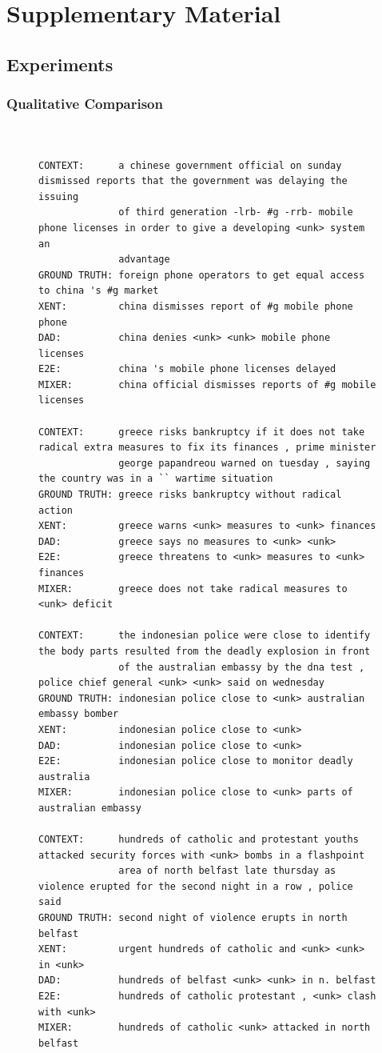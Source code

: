 \section{Supplementary Material}


\subsection{Experiments}


\subsubsection{Qualitative Comparison}
\begin{figure}[h!]
\tiny{
\begin{verbatim}


CONTEXT:      a chinese government official on sunday dismissed reports that the government was delaying the issuing
              of third generation -lrb- #g -rrb- mobile phone licenses in order to give a developing <unk> system an
              advantage
GROUND TRUTH: foreign phone operators to get equal access to china 's #g market
XENT:         china dismisses report of #g mobile phone phone
DAD:          china denies <unk> <unk> mobile phone licenses
E2E:          china 's mobile phone licenses delayed
MIXER:        china official dismisses reports of #g mobile licenses

CONTEXT:      greece risks bankruptcy if it does not take radical extra measures to fix its finances , prime minister
              george papandreou warned on tuesday , saying the country was in a `` wartime situation
GROUND TRUTH: greece risks bankruptcy without radical action
XENT:         greece warns <unk> measures to <unk> finances
DAD:          greece says no measures to <unk> <unk>
E2E:          greece threatens to <unk> measures to <unk> finances
MIXER:        greece does not take radical measures to <unk> deficit

CONTEXT:      the indonesian police were close to identify the body parts resulted from the deadly explosion in front
              of the australian embassy by the dna test , police chief general <unk> <unk> said on wednesday
GROUND TRUTH: indonesian police close to <unk> australian embassy bomber
XENT:         indonesian police close to <unk>
DAD:          indonesian police close to <unk>
E2E:          indonesian police close to monitor deadly australia
MIXER:        indonesian police close to <unk> parts of australian embassy

CONTEXT:      hundreds of catholic and protestant youths attacked security forces with <unk> bombs in a flashpoint
              area of north belfast late thursday as violence erupted for the second night in a row , police said
GROUND TRUTH: second night of violence erupts in north belfast
XENT:         urgent hundreds of catholic and <unk> <unk> in <unk>
DAD:          hundreds of belfast <unk> <unk> in n. belfast
E2E:          hundreds of catholic protestant , <unk> clash with <unk>
MIXER:        hundreds of catholic <unk> attacked in north belfast


\end{verbatim}}
\end{figure}
